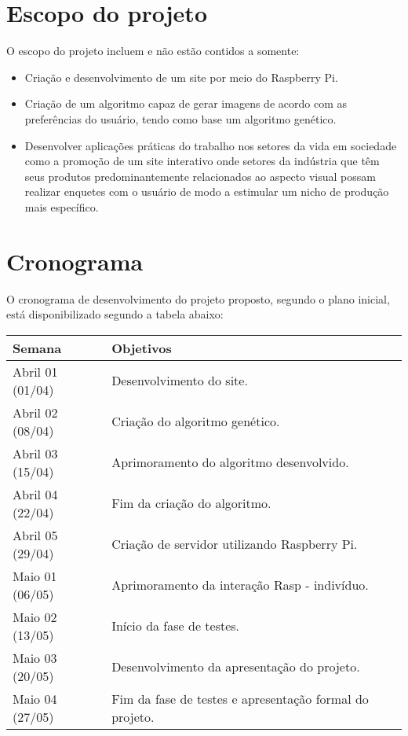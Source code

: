 \documentclass{article}
\begin{document}
	\section{Escopo do projeto}
	O escopo do projeto incluem e não estão contidos a somente:
	\begin{itemize}
		\item Criação e desenvolvimento de um site por meio do Raspberry Pi.
		
		\item Criação de um algoritmo capaz de gerar imagens de acordo com as preferências do usuário, tendo como base um algoritmo genético. 
		
		\item Desenvolver aplicações práticas do trabalho nos setores da vida em sociedade como a promoção de um site interativo onde setores da indústria que têm seus produtos predominantemente relacionados ao aspecto visual possam realizar enquetes com o usuário de modo a estimular um nicho de produção mais específico.

	\end{itemize}
	
	\section{Cronograma}
	
	O cronograma de desenvolvimento do projeto proposto, segundo o plano inicial, está disponibilizado segundo a tabela abaixo: 
	
	\begin{center}
		\begin{tabular}{| l | l |}
			\hline
			Semana & Objetivos \\ \hline
			Abril 01 (01/04) & Desenvolvimento do site.\\ \hline
			Abril 02 (08/04) & Criação do algoritmo genético.\\ \hline
			Abril 03 (15/04) & Aprimoramento do algoritmo desenvolvido.\\ \hline
			Abril 04 (22/04)& Fim da criação do algoritmo.\\ \hline
			Abril 05 (29/04) & Criação de servidor utilizando Raspberry Pi.\\ \hline
			Maio 01 (06/05)&  Aprimoramento da interação Rasp - indivíduo.\\ \hline
			Maio 02 (13/05)& Início da fase de testes.\\ \hline
			Maio 03 (20/05)& Desenvolvimento da apresentação do projeto.\\ \hline
			Maio 04 (27/05)& Fim da fase de testes e apresentação formal do projeto. \\ \hline
		\end{tabular}
	\end{center}
\end{document}
